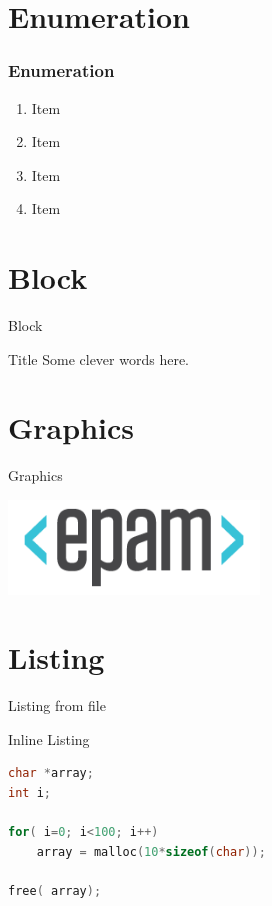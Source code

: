 \section{Enumeration}
\begin{frame}
    \frametitle{Enumeration}

    \begin{enumerate}
	\item Item
	\item Item
	\item Item
	\item Item
    \end{enumerate}
\end{frame}

\section{Block}
\begin{frame}{Block}
	\begin{block}{Title}
	    Some clever words here.
	\end{block}
\end{frame}

\section{Graphics}
\begin{frame}{Graphics}
    \begin{center}
	\includegraphics[width=0.5\textwidth]{epam}
    \end{center}
\end{frame}

\section{Listing}
\begin{frame}[fragile]{Listing from file}

    

\end{frame}

\begin{frame}[fragile]{Inline Listing}

	\begin{lstlisting}[language=C]
char *array;
int i;

for( i=0; i<100; i++)
    array = malloc(10*sizeof(char));

free( array);
	\end{lstlisting}
\end{frame}

